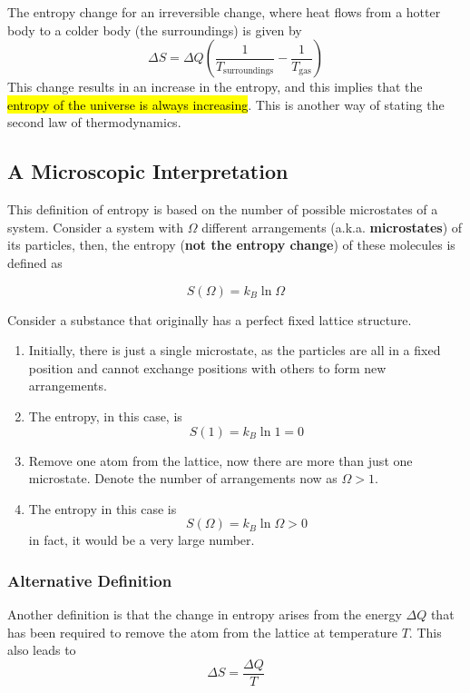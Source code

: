 \documentclass[a4paper,12pt]{article}
\begin{document}
The entropy change for an irreversible change, where heat flows from a hotter body to a colder body (the surroundings) is given by
\begin{equation}\label{eq:irreversible}
  \Delta S =\Delta Q\left(\frac{1}{T_\text{surroundings}} - \frac{1}{T_\text{gas}}\right)
\end{equation}
This change results in an increase in the entropy, and this implies that the \hl{entropy of the universe is always increasing}. This is another way of stating the second law of thermodynamics.

\pagebreak

\subsection{A Microscopic Interpretation}

This definition of entropy is based on the number of possible microstates of a system. Consider a system with $\Omega$ different arrangements (a.k.a. \textbf{microstates}) of its particles, then, the entropy (\textbf{not the entropy change}) of these molecules is defined as

\begin{equation}\label{eq:microentropy}
  S(\Omega) = k_B\ln\Omega
\end{equation}

Consider a substance that originally has a perfect fixed lattice structure.
\begin{enumerate}
  \item Initially, there is just a single microstate, as the particles are all in a fixed position and cannot exchange positions with others to form new arrangements.
  \item The entropy, in this case, is $$S(1) = k_B\ln 1 = 0$$
  \item Remove one atom from the lattice, now there are more than just one microstate. Denote the number of arrangements now as $\Omega > 1$.
  \item The entropy in this case is $$S(\Omega) = k_B\ln\Omega > 0$$
        in fact, it would be a very large number.
\end{enumerate}

\pagebreak

\subsubsection{Alternative Definition}

Another definition is that the change in entropy arises from the energy $\Delta Q$ that has been required to remove the atom from the lattice at temperature $T$. This also leads to
$$
  \Delta S = \dfrac{\Delta Q}{T}
$$
\end{document}
